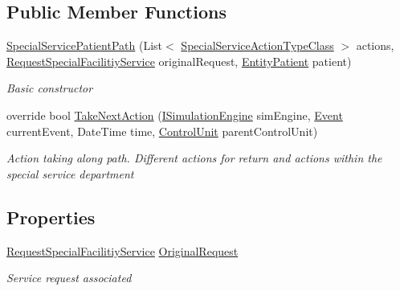 \subsection*{Public Member Functions}
\begin{DoxyCompactItemize}
\item 
\hyperlink{class_general_health_care_elements_1_1_special_facility_1_1_special_service_patient_path_a65b8ab4f153db660de2cc1103ef84afc}{Special\+Service\+Patient\+Path} (List$<$ \hyperlink{class_general_health_care_elements_1_1_general_classes_1_1_action_types_and_paths_1_1_special_service_action_type_class}{Special\+Service\+Action\+Type\+Class} $>$ actions, \hyperlink{class_general_health_care_elements_1_1_special_facility_1_1_request_special_facilitiy_service}{Request\+Special\+Facilitiy\+Service} original\+Request, \hyperlink{class_general_health_care_elements_1_1_entities_1_1_entity_patient}{Entity\+Patient} patient)
\begin{DoxyCompactList}\small\item\em Basic constructor \end{DoxyCompactList}\item 
override bool \hyperlink{class_general_health_care_elements_1_1_special_facility_1_1_special_service_patient_path_ae6bf0331ccb8b20092fa678c938b91bc}{Take\+Next\+Action} (\hyperlink{interface_simulation_core_1_1_simulation_classes_1_1_i_simulation_engine}{I\+Simulation\+Engine} sim\+Engine, \hyperlink{class_simulation_core_1_1_h_c_c_m_elements_1_1_event}{Event} current\+Event, Date\+Time time, \hyperlink{class_simulation_core_1_1_h_c_c_m_elements_1_1_control_unit}{Control\+Unit} parent\+Control\+Unit)
\begin{DoxyCompactList}\small\item\em Action taking along path. Different actions for return and actions within the special service department \end{DoxyCompactList}\end{DoxyCompactItemize}
\subsection*{Properties}
\begin{DoxyCompactItemize}
\item 
\hyperlink{class_general_health_care_elements_1_1_special_facility_1_1_request_special_facilitiy_service}{Request\+Special\+Facilitiy\+Service} \hyperlink{class_general_health_care_elements_1_1_special_facility_1_1_special_service_patient_path_ae6492f97b02cf0b7b73a54a01813bf26}{Original\+Request}
\begin{DoxyCompactList}\small\item\em Service request associated \end{DoxyCompactList}\end{DoxyCompactItemize}


